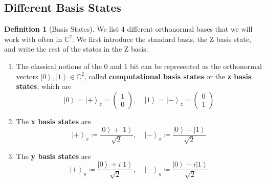 \documentclass{article}
\newcommand{\ket}[1]{\ensuremath{\left|#1\right\rangle}}
\theoremstyle{definition}
\newtheorem{definition}{Definition}[section]
\begin{document}
   

  \subsection{Different Basis States}

    \begin{definition}[Basis States]
      We list 4 different orthonormal bases that we will work with often in $\mathbb{C}^2$. We first introduce the standard basis, the Z basis state, and write the rest of the states in the Z basis. 

      \begin{enumerate}
        \item The classical notions of the $0$ and $1$ bit can be represented as the orthonormal vectors $\ket{0}, \ket{1} \in \mathbb{C}^2$, called \textbf{computational basis states} or the \textbf{z basis states}, which are
          \[\ket{0} = \ket{+}_z = \begin{pmatrix} 1 \\ 0 \end{pmatrix}, \;\;\;\; \ket{1} = \ket{-}_z = \begin{pmatrix} 0 \\ 1 \end{pmatrix}\]  

        \item The \textbf{x basis states} are 
          \begin{equation}
            \ket{+}_x \coloneqq \frac{\ket{0} + \ket{1}}{\sqrt{2}} , \;\;\;\; \ket{-}_x \coloneqq \frac{\ket{0} - \ket{1}}{\sqrt{2}} 
            \label{eq:x_basis}
          \end{equation}
        
        \item The \textbf{y basis states} are 
          \begin{equation}
            \ket{+}_y \coloneqq \frac{\ket{0} + i \ket{1}}{\sqrt{2}} , \;\;\;\; \ket{-}_y \coloneqq \frac{\ket{0} - i \ket{1}}{\sqrt{2}} 
            \label{eq:y_basis}
          \end{equation}
      \end{enumerate}      
    \end{definition}
\end{document}
